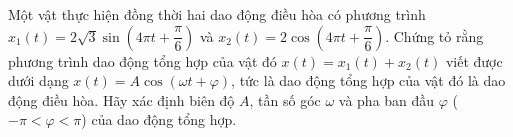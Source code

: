 \begin{bt}[VDC]%
	Một vật thực hiện đồng thời hai dao động điều hòa có phương trình $x_1(t) =2\sqrt{3} \sin \left(4\pi t+\dfrac{\pi}{6}\right)$ và $x_2(t) = 2\cos \left(4\pi t+\dfrac{\pi}{6}\right)$. Chứng tỏ rằng phương trình dao động tổng hợp của vật đó $x(t) = x_1(t)+x_2(t)$ viết được dưới dạng $x(t) = A\cos (\omega t + \varphi)$, tức là dao động tổng hợp của vật đó là dao động điều hòa. Hãy xác định biên độ $A$, tần số góc $\omega$ và pha ban đầu $\varphi$ ($-\pi<\varphi<\pi$) của dao động tổng hợp.
\end{bt}

